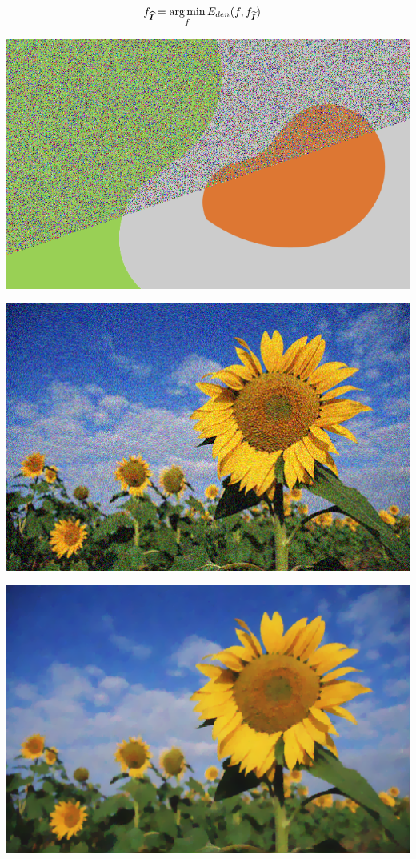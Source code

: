 \begin{frame}
{\begin{minipage}[t][0.25\textheight][t]{\textwidth}
%
%
\begin{align*}
	f_{\widehat{\bm{I}}} &= \operatorname*{arg\,min}_f E_{den}(f,f_{\bm{\widetilde{I}}})
\end{align*}
%
%
\begin{minipage}{.3\textwidth}
\center
\includegraphics[scale=0.26]{figures/motivation/denoising-stylised.png}
\end{minipage}
\begin{minipage}{.3\textwidth}
\center
\includegraphics[scale=0.15]{figures/motivation/pock-sunflower-noisy.png}
\end{minipage}
\begin{minipage}{.3\textwidth}
\center
\includegraphics[scale=0.15]{figures/motivation/pock-sunflower-fista-denoising-100.png}

\end{minipage}
\end{minipage}}
\end{frame}
